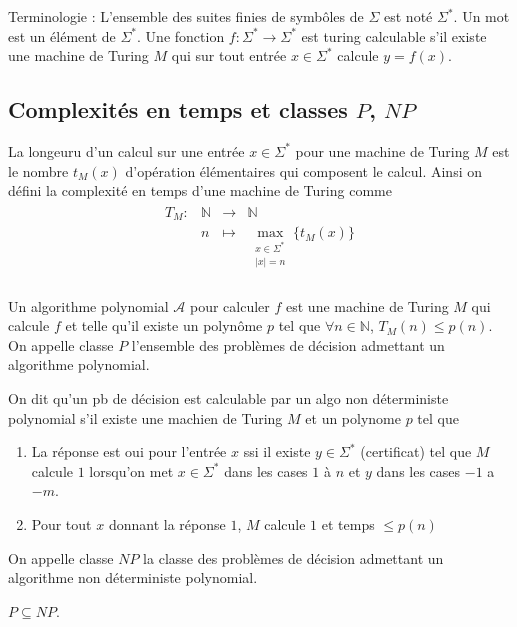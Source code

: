                 Terminologie : L'ensemble des suites finies de symbôles de $\Sigma$ est noté $\Sigma^*$. Un mot est un élément de $\Sigma^*$. Une fonction $f : \Sigma^* \to \Sigma^*$ est turing calculable s'il existe une machine de Turing $M$ qui sur tout entrée $x \in \Sigma^*$ calcule $y = f(x)$.

        \subsection{Complexités en temps et classes $P$, $NP$}
            \begin{defi}
                La longeuru d'un calcul sur une entrée $x \in \Sigma^*$ pour une machine de Turing $M$ est le nombre $t_M(x)$ d'opération élémentaires qui composent le calcul. Ainsi on défini la complexité en temps d'une machine de Turing comme
                \begin{align*}
                    \begin{array}{cccc}
                        T_M : & \mathbb{N} & \to & \mathbb{N} \\
                        & n & \mapsto & \max_{\substack{x \in \Sigma^* \\ |x| = n}} \{t_M(x)\} \\
                    \end{array}
                \end{align*}
            \end{defi}
            \begin{defi}
                Un algorithme polynomial $\mathcal{A}$ pour calculer $f$ est une machine de Turing $M$ qui calcule $f$ et telle qu'il existe un polynôme $p$ tel que $\forall n \in \mathbb{N}$, $T_M(n) \leq p(n)$. On appelle classe $P$ l'ensemble des problèmes de décision admettant un algorithme polynomial.
            \end{defi}
            \begin{defi}
                On dit qu'un pb de décision est calculable par un algo non déterministe polynomial s'il existe une machien de Turing $M$ et un polynome $p$ tel que 
                \begin{enumerate}
                    \item La réponse est oui pour l'entrée $x$ ssi il existe $y \in \Sigma^*$ (certificat) tel que $M$ calcule $1$ lorsqu'on met $x \in \Sigma^*$ dans les cases $1$ à $n$ et $y$ dans les cases $-1$ a $-m$.
                    \item Pour tout $x$ donnant la réponse $1$, $M$ calcule $1$ et temps $\leq p(n)$
                \end{enumerate}
                On appelle classe $NP$ la classe des problèmes de décision admettant un algorithme non déterministe polynomial.
            \end{defi}
            \begin{remq}
                $P \subseteq NP$.
            \end{remq}
            
